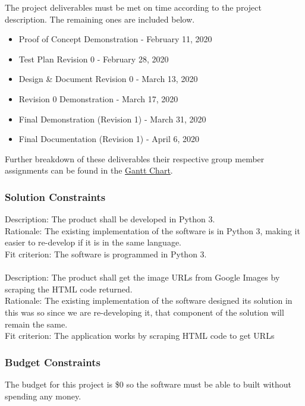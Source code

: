 \documentclass[12pt, titlepage]{article}
\begin{document}
The project deliverables must be met on time according to the project description. The remaining ones are included below.

\begin{itemize}
    \item Proof of Concept Demonstration - February 11, 2020
    \item Test Plan Revision 0 - February 28, 2020
    \item Design \& Document Revision 0 - March 13, 2020
    \item Revision 0 Demonstration - March 17, 2020
    \item Final Demonstration (Revision 1) - March 31, 2020
    \item Final Documentation (Revision 1) - April 6, 2020
\end{itemize}

Further breakdown of these deliverables their respective group member assignments can be found in the \href{https://gitlab.cas.mcmaster.ca/guinnesj/google-images-downloader/blob/master/ProjectSchedule/Gantt-Chart.pdf}{Gantt Chart}.

\subsubsection{Solution Constraints}

Description: The product shall be developed in Python 3.\\
Rationale: The existing implementation of the software is in Python 3, making it easier to re-develop if it is in the same language.\\
Fit criterion: The software is programmed in Python 3.
\\ \\
Description: The product shall get the image URLs from Google Images by scraping the HTML code returned.\\
Rationale: The existing implementation of the software designed its solution in this was so since we are re-developing it, that component of the solution will remain the same.\\
Fit criterion: The application works by scraping HTML code to get URLs

\subsubsection{Budget Constraints}

The budget for this project is \$0 so the software must be able to built without spending any money.
\end{document}
